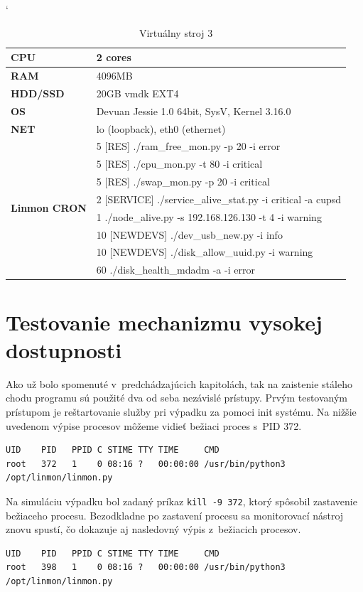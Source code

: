 \begin{table}[H]
	\catcode`
	\begin{center}
		\begin{tabular}{|l|l|}
			\hline
			\textbf{CPU} & 2 cores \\
			\hline
			\textbf{RAM} & 4096MB  \\
			\hline
			\textbf{HDD/SSD} & 20GB vmdk EXT4 \\
			\hline
			\textbf{OS} & Devuan Jessie 1.0 64bit, SysV, Kernel 3.16.0 \\
			\hline
			\textbf{NET}& lo (loopback), eth0 (ethernet)\\
			\hline
			\multirow{8}{*}{\textbf{Linmon CRON}}  & 5 [RES] ./ram\_free\_mon.py -p 20 -i error\\
			& 5 [RES] ./cpu\_mon.py -t 80 -i critical\\
			& 5 [RES] ./swap\_mon.py -p 20 -i critical\\
			& 2 [SERVICE] ./service\_alive\_stat.py -i critical -a cupsd\\
			& 1 ./node\_alive.py -s 192.168.126.130 -t 4 -i warning\\
			& 10 [NEWDEVS] ./dev\_usb\_new.py -i info \\
			& 10 [NEWDEVS] ./disk\_allow\_uuid.py -i warning\\
			& 60 ./disk\_health\_mdadm -a -i error\\
			\hline			
		\end{tabular}
		\caption{Virtuálny stroj 3}
		\label{virt_dev3}
	\end{center}
\end{table}
\newpage
\section{Testovanie mechanizmu vysokej dostupnosti}
Ako už bolo spomenuté v~predchádzajúcich kapitolách, tak na zaistenie stáleho chodu programu sú použité dva od seba nezávislé prístupy. Prvým testovaným prístupom je reštartovanie služby pri výpadku za pomoci init systému. Na nižšie uvedenom výpise procesov môžeme vidieť bežiaci proces s~PID 372.

\begin{verbatim}
UID    PID   PPID C STIME TTY TIME     CMD
root   372   1    0 08:16 ?   00:00:00 /usr/bin/python3 /opt/linmon/linmon.py
\end{verbatim}

Na simuláciu výpadku bol zadaný príkaz \texttt{kill -9 372}, ktorý spôsobil zastavenie bežiaceho procesu. Bezodkladne po zastavení procesu sa monitorovací nástroj znovu spustí, čo dokazuje aj nasledovný výpis z~bežiacich procesov.
\begin{verbatim}
UID    PID   PPID C STIME TTY TIME     CMD
root   398   1    0 08:16 ?   00:00:00 /usr/bin/python3 /opt/linmon/linmon.py
\end{verbatim}

